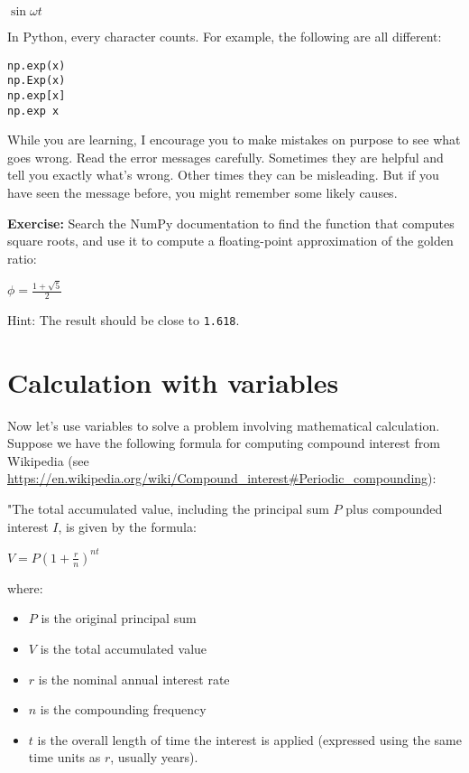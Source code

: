 \(\sin \omega t\)

In Python, every character counts. For example, the following are all
different:

\begin{lstlisting}[]
np.exp(x)
np.Exp(x)
np.exp[x]
np.exp x
\end{lstlisting}

While you are learning, I encourage you to make mistakes on purpose to
see what goes wrong. Read the error messages carefully. Sometimes they
are helpful and tell you exactly what's wrong. Other times they can be
misleading. But if you have seen the message before, you might remember
some likely causes.

\textbf{Exercise:} Search the NumPy documentation to find the function
that computes square roots, and use it to compute a floating-point
approximation of the golden ratio:

\(\phi = \frac{1 + \sqrt{5}}{2}\)

Hint: The result should be close to \passthrough{\lstinline!1.618!}.

\hypertarget{calculation-with-variables}{%
\section{Calculation with variables}\label{calculation-with-variables}}

Now let's use variables to solve a problem involving mathematical
calculation. Suppose we have the following formula for computing
compound interest from Wikipedia (see
\url{https://en.wikipedia.org/wiki/Compound_interest\#Periodic_compounding}):

"The total accumulated value, including the principal sum \(P\) plus
compounded interest \(I\), is given by the formula:

\(V=P\left(1+{\frac {r}{n}}\right)^{nt}\)

where:

\begin{itemize}
\item
  \(P\) is the original principal sum
\item
  \(V\) is the total accumulated value
\item
  \(r\) is the nominal annual interest rate
\item
  \(n\) is the compounding frequency
\item
  \(t\) is the overall length of time the interest is applied (expressed
  using the same time units as \(r\), usually years).
\end{itemize}

